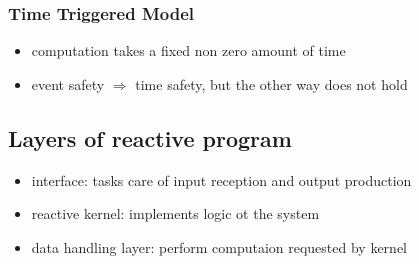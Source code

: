 \documentclass[german]{latex4ei/latex4ei_sheet}
\begin{document}
\begin{sectionbox}
\subsubsection{Time Triggered Model}
\begin{itemize}
\item computation takes a fixed non zero amount of time
\item event safety $\Rightarrow$ time safety, but the other way does not hold
\end{itemize}

\subsection{Layers of reactive program}
\begin{itemize}
\item interface: tasks care of input reception and output production
\item reactive kernel: implements logic ot the system
\item data handling layer: perform computaion requested by kernel
\end{itemize}
\end{sectionbox}
\end{document}
